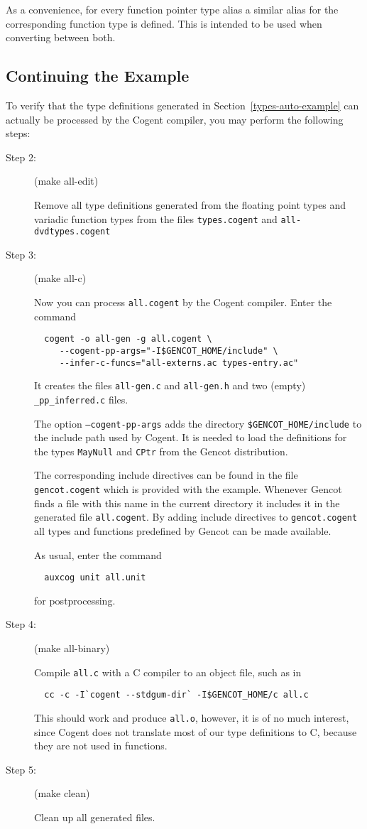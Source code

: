\documentclass[a4paper]{report}
\newcommand{\code}[1]{\textnormal{\texttt{#1}}}
\begin{document}
As a convenience, for every function pointer type alias a similar alias for the corresponding function type is 
defined. This is intended to be used when converting between both.

\subsection{Continuing the Example}

To verify that the type definitions generated in Section~\ref{types-auto-example} can actually be processed by the 
Cogent compiler, you may perform the following steps:

\begin{description}
\item[Step 2:] (make all-edit)

Remove all type definitions generated from the floating point types and variadic function types 
from the files \code{types.cogent} and \code{all-dvdtypes.cogent}

\item[Step 3:] (make all-c)

Now you can process \code{all.cogent} by the Cogent compiler. Enter the command
\begin{verbatim}
  cogent -o all-gen -g all.cogent \
     --cogent-pp-args="-I$GENCOT_HOME/include" \
     --infer-c-funcs="all-externs.ac types-entry.ac"
\end{verbatim}
It creates the files \code{all-gen.c} and \code{all-gen.h} and two (empty) \code{\_pp\_inferred.c} files. 

The option \code{--cogent-pp-args} adds the directory \code{\$GENCOT\_HOME/include} to the include path
used by Cogent. It is needed to load the definitions for the types \code{MayNull} and \code{CPtr} from
the Gencot distribution. 

The corresponding include directives can be found in the file \code{gencot.cogent}
which is provided with the example. Whenever Gencot finds a file with this name in the current directory it 
includes it in the generated file \code{all.cogent}. By adding include directives to \code{gencot.cogent}
all types and functions predefined by Gencot can be made available.

As usual, enter the command
\begin{verbatim}
  auxcog unit all.unit
\end{verbatim}
for postprocessing.

\item[Step 4:] (make all-binary)

Compile \code{all.c} with a C compiler to an object file, such as in 
\begin{verbatim}
  cc -c -I`cogent --stdgum-dir` -I$GENCOT_HOME/c all.c
\end{verbatim}
This should work and produce \code{all.o}, however, it is of no much interest,
since Cogent does not translate most of our type definitions to C, because they are not used in functions.

\item[Step 5:] (make clean)

Clean up all generated files.
\end{description}
\end{document}
